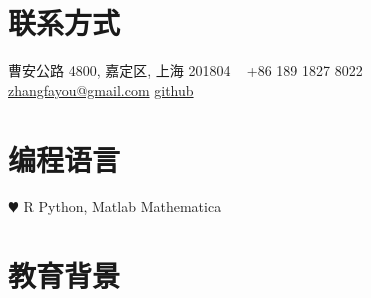 \documentclass[print]{friggeri-cv} %
\begin{document}


\begin{aside} %
\section{联系方式}
曹安公路 4800,
嘉定区, 上海
201804
~
+86 189 1827 8022
~
\href{mailto:zhangfayou@gmail.com}{zhangfayou@gmail.com}
\href{http://fayolchang.github.io/hexoblog}{github}
\section{编程语言}
{\color{red} $\varheartsuit$} R
Python, Matlab Mathematica
\end{aside}


\section{教育背景}
\end{document}

